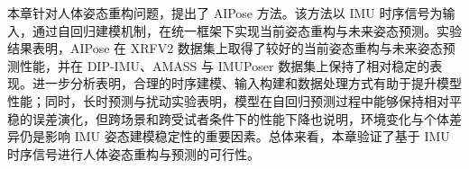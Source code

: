 
本章针对人体姿态重构问题，提出了 AIPose 方法。该方法以 IMU 时序信号为输入，通过自回归建模机制，在统一框架下实现当前姿态重构与未来姿态预测。实验结果表明，AIPose 在 XRFV2 数据集上取得了较好的当前姿态重构与未来姿态预测性能，并在 DIP-IMU、AMASS 与 IMUPoser 数据集上保持了相对稳定的表现。进一步分析表明，合理的时序建模、输入构建和数据处理方式有助于提升模型性能；同时，长时预测与扰动实验表明，模型在自回归预测过程中能够保持相对平稳的误差演化，但跨场景和跨受试者条件下的性能下降也说明，环境变化与个体差异仍是影响 IMU 姿态建模稳定性的重要因素。总体来看，本章验证了基于 IMU 时序信号进行人体姿态重构与预测的可行性。